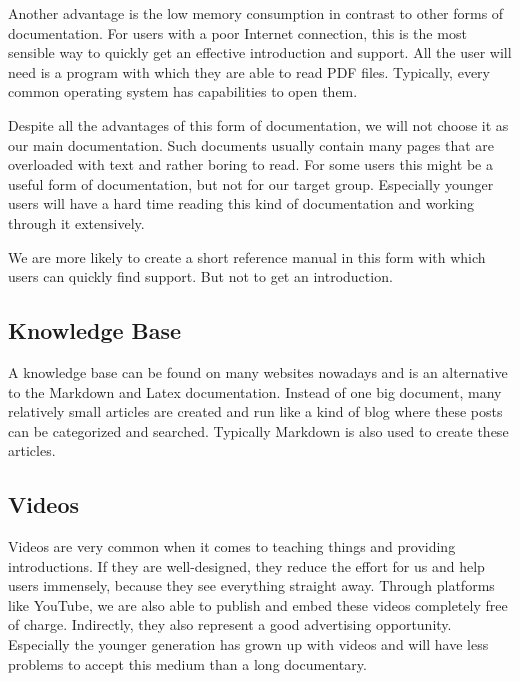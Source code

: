 Another advantage is the low memory consumption in contrast to other forms of documentation. For users with a poor Internet connection, this is the most sensible way to quickly get an effective introduction and support. All the user will need is a program with which they are able to read PDF files. Typically, every common operating system has capabilities to open them.

\vspace{0.5cm}

Despite all the advantages of this form of documentation, we will not choose it as our main documentation. Such documents usually contain many pages that are overloaded with text and rather boring to read.  For some users this might be a useful form of documentation, but not for our target group. Especially younger users will have a hard time reading this kind of documentation and working through it extensively.

\vspace{0.5cm}

We are more likely to create a short reference manual in this form with which users can quickly find support. But not to get an introduction.

\subsection{Knowledge Base}

A knowledge base can be found on many websites nowadays and is an alternative to the Markdown and Latex documentation. Instead of one big document, many relatively small articles are created and run like a kind of blog where these posts can be categorized and searched. Typically Markdown is also used to create these articles.

\subsection{Videos}

Videos are very common when it comes to teaching things and providing introductions. If they are well-designed, they reduce the effort for us and help users immensely, because they see everything straight away. Through platforms like YouTube, we are also able to publish and embed these videos completely free of charge. Indirectly, they also represent a good advertising opportunity. Especially the younger generation has grown up with videos and will have less problems to accept this medium than a long documentary.

